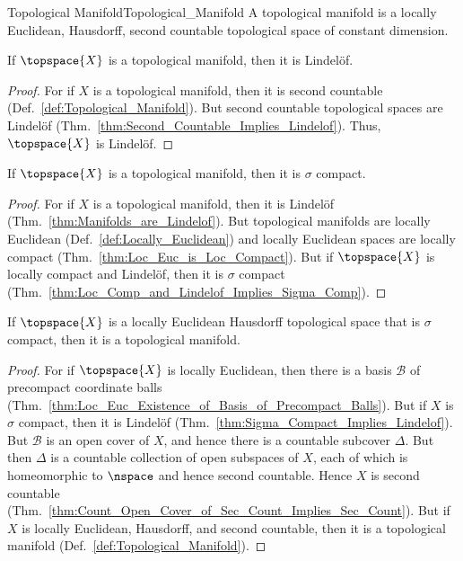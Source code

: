         \begin{fdefinition}{Topological Manifold}{Topological_Manifold}
            A topological manifold is a locally Euclidean, Hausdorff, second
            countable topological space of constant dimension.
        \end{fdefinition}
        \begin{theorem}
            \label{thm:Manifolds_are_Lindelof}%
            If $\topspace{X}$ is a topological manifold, then it is
            Lindel\"{o}f.
        \end{theorem}
        \begin{proof}
            For if $X$ is a topological manifold, then it is second countable
            (Def.~\ref{def:Topological_Manifold}). But second countable
            topological spaces are Lindel\"{o}f
            (Thm.~\ref{thm:Second_Countable_Implies_Lindelof}). Thus,
            $\topspace{X}$ is Lindel\"{o}f.
        \end{proof}
        \begin{theorem}
            \label{thm:Manifolds_are_Sigma_Compact}%
            If $\topspace{X}$ is a topological manifold, then it is $\sigma$
            compact.
        \end{theorem}
        \begin{proof}
            For if $X$ is a topological manifold, then it is Lindel\"{o}f
            (Thm.~\ref{thm:Manifolds_are_Lindelof}). But topological manifolds
            are locally Euclidean (Def.~\ref{def:Locally_Euclidean}) and locally
            Euclidean spaces are locally compact
            (Thm.~\ref{thm:Loc_Euc_is_Loc_Compact}). But if $\topspace{X}$ is
            locally compact and Lindel\"{o}f, then it is $\sigma$ compact
            (Thm.~\ref{thm:Loc_Comp_and_Lindelof_Implies_Sigma_Comp}).
        \end{proof}
        \begin{theorem}
            \label{thm:Loc_Euc_Haus_Sigma_Comp_is_Manifold}%
            If $\topspace{X}$ is a locally Euclidean Hausdorff topological
            space that is $\sigma$ compact, then it is a topological manifold.
        \end{theorem}
        \begin{proof}
            For if $\topspace{X}$ is locally Euclidean, then there is a basis
            $\mathcal{B}$ of precompact coordinate balls
            (Thm.~\ref{thm:Loc_Euc_Existence_of_Basis_of_Precompact_Balls}).
            But if $X$ is $\sigma$ compact, then it is Lindel\"{o}f
            (Thm.~\ref{thm:Sigma_Compact_Implies_Lindelof}). But $\mathcal{B}$
            is an open cover of $X$, and hence there is a countable subcover
            $\Delta$. But then $\Delta$ is a countable collection of open
            subspaces of $X$, each of which is homeomorphic to
            $\nspace$ and hence second countable. Hence $X$ is second countable
            (Thm.~\ref{thm:Count_Open_Cover_of_Sec_Count_Implies_Sec_Count}).
            But if $X$ is locally Euclidean, Hausdorff, and second countable,
            then it is a topological manifold
            (Def.~\ref{def:Topological_Manifold}).
        \end{proof}
